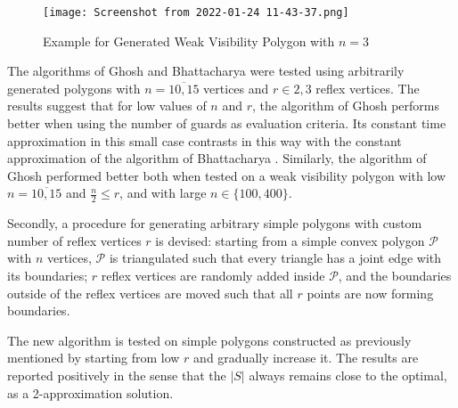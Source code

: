 \begin{figure}[h!]
    \centering
    \texttt{[image: Screenshot from 2022-01-24 11-43-37.png]}
    \caption{Example for Generated Weak Visibility Polygon with $n = 3$}
    \label{fig:weak}
\end{figure}

The algorithms of Ghosh \cite{GHOSH2010718} and Bhattacharya \cite{bhattacharya2016approximability} were tested using arbitrarily generated polygons with $n = \overline{10, 15}$ vertices and $r \in {2, 3}$ reflex vertices. The results suggest that for low values of $n$ and $r$, the algorithm of Ghosh \cite{GHOSH2010718} performs better when using the number of guards as evaluation criteria. Its constant time approximation in this small case contrasts in this way with the constant approximation of the algorithm of Bhattacharya \cite{bhattacharya2016approximability}. Similarly, the algorithm of Ghosh \cite{GHOSH2010718} performed better both when tested on a weak visibility polygon with low $n = \overline{10, 15}$ and $\frac n 2 \leq r$, and with large $n \in \{100, 400\}$.

Secondly, a procedure for generating arbitrary simple polygons with custom number of reflex vertices $r$ is devised: starting from a simple convex polygon $\mathcal P$ with $n$ vertices, $\mathcal P$ is triangulated such that every triangle has a joint edge with its boundaries; $r$ reflex vertices are randomly added inside $\mathcal P$, and the boundaries outside of the reflex vertices are moved such that all $r$ points are now forming boundaries.

The new algorithm is tested on simple polygons constructed as previously mentioned by starting from low $r$ and gradually increase it. The results are reported positively in the sense that the $|S|$ always remains close to the optimal, as a 2-approximation solution.

